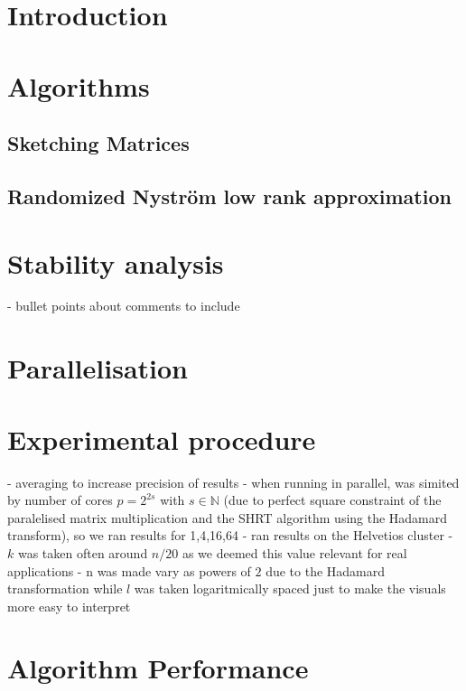 \documentclass[a4paper, 12pt,oneside]{article}
\begin{document}
 
	 
	\clearpage
	\tableofcontents
	\thispagestyle{empty}
	\clearpage
	\setcounter{page}{1}

	\section{Introduction}
		\lipsum[1]
	\section{Algorithms}
        \subsection{Sketching Matrices}
        \subsection{Randomized Nyström low rank approximation}
	\section{Stability analysis}
		- bullet points about comments to include 
	\section{Parallelisation}
	\section{Experimental procedure}
		- averaging to increase precision of results
		- when running in parallel, was simited by number of cores $p=2^{2s}$ with $s\in\mathbb{N}$ (due to perfect square constraint of the paralelised matrix multiplication and the SHRT algorithm using the Hadamard transform), so we ran results for 1,4,16,64
		- ran results on the Helvetios cluster 
		- $k$ was taken often around $n/20$ as we deemed this value relevant for real applications
		- n was made vary as powers of $2$ due to the Hadamard transformation while $l$ was taken logaritmically spaced just to make the visuals more easy to interpret  
	\section{Algorithm Performance}
\end{document}
